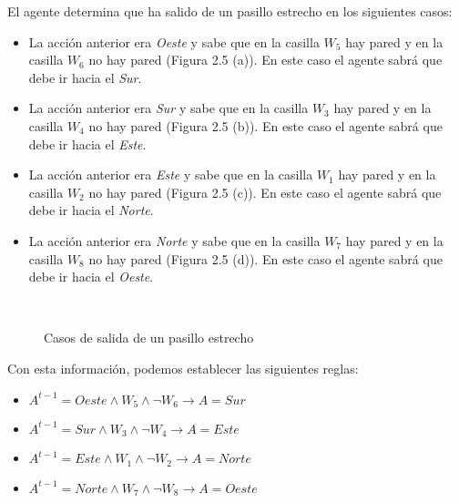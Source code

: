 El agente determina que ha salido de un pasillo estrecho en los siguientes casos:
\begin{itemize}
    \item La acción anterior era \emph{Oeste} y sabe que en la casilla \emph{$W_{5}$} hay pared y en la casilla \emph{$W_{6}$} no hay pared (Figura 2.5 (a)). En este caso el agente sabrá que debe ir hacia el \emph{Sur}.
    
    \item La acción anterior era \emph{Sur} y sabe que en la casilla \emph{$W_{3}$} hay pared y en la casilla \emph{$W_{4}$} no hay pared  (Figura 2.5 (b)). En este caso el agente sabrá que debe ir hacia el \emph{Este}.
    
    \item La acción anterior era \emph{Este} y sabe que en la casilla \emph{$W_{1}$} hay pared y en la casilla \emph{$W_{2}$} no hay pared  (Figura 2.5 (c)). En este caso el agente sabrá que debe ir hacia el \emph{Norte}.
    
    \item La acción anterior era \emph{Norte} y sabe que en la casilla \emph{$W_{7}$} hay pared y en la casilla \emph{$W_{8}$} no hay pared  (Figura 2.5 (d)). En este caso el agente sabrá que debe ir hacia el \emph{Oeste}.
\end{itemize}

\begin{figure}[htb]
\centering
  \hspace{1em}
  \\
  \hspace{1em}
  \caption{Casos de salida de un pasillo estrecho}\label{fig:salir_pasillo}
\end{figure}

\FloatBarrier

\hfill

Con esta información, podemos establecer las siguientes reglas:

\begin{itemize}
    \item \emph{$A^{t-1} = Oeste \land W_{5} \land \neg W_{6} \longrightarrow A = Sur $}
    \item \emph{$A^{t-1} = Sur \land W_{3} \land \neg W_{4} \longrightarrow A = Este $}
    \item \emph{$A^{t-1} = Este \land W_{1} \land \neg W_{2} \longrightarrow A = Norte $}
    \item \emph{$A^{t-1} = Norte \land W_{7} \land \neg W_{8} \longrightarrow A = Oeste $}
\end{itemize}


